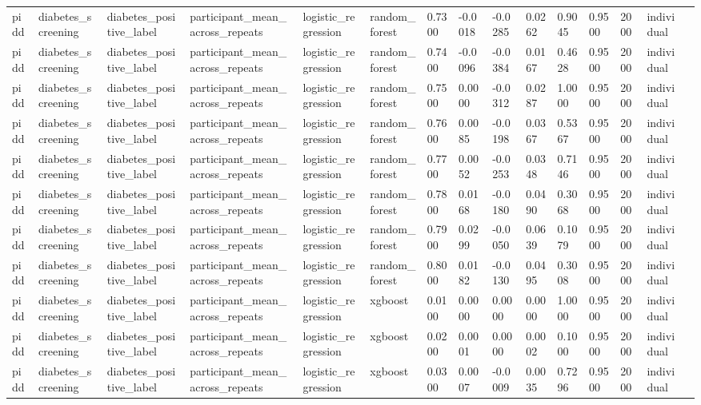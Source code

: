 \begin{tabular}{lllllllllllllll}
pidd & diabetes\_screening & diabetes\_positive\_label & participant\_mean\_across\_repeats & logistic\_regression & random\_forest & 0.7300 & -0.0018 & -0.0285 & 0.0262 & 0.9045 & 0.9500 & 2000 & individual &  \\
pidd & diabetes\_screening & diabetes\_positive\_label & participant\_mean\_across\_repeats & logistic\_regression & random\_forest & 0.7400 & -0.0096 & -0.0384 & 0.0167 & 0.4628 & 0.9500 & 2000 & individual &  \\
pidd & diabetes\_screening & diabetes\_positive\_label & participant\_mean\_across\_repeats & logistic\_regression & random\_forest & 0.7500 & 0.0000 & -0.0312 & 0.0287 & 1.0000 & 0.9500 & 2000 & individual &  \\
pidd & diabetes\_screening & diabetes\_positive\_label & participant\_mean\_across\_repeats & logistic\_regression & random\_forest & 0.7600 & 0.0085 & -0.0198 & 0.0367 & 0.5367 & 0.9500 & 2000 & individual &  \\
pidd & diabetes\_screening & diabetes\_positive\_label & participant\_mean\_across\_repeats & logistic\_regression & random\_forest & 0.7700 & 0.0052 & -0.0253 & 0.0348 & 0.7146 & 0.9500 & 2000 & individual &  \\
pidd & diabetes\_screening & diabetes\_positive\_label & participant\_mean\_across\_repeats & logistic\_regression & random\_forest & 0.7800 & 0.0168 & -0.0180 & 0.0490 & 0.3068 & 0.9500 & 2000 & individual &  \\
pidd & diabetes\_screening & diabetes\_positive\_label & participant\_mean\_across\_repeats & logistic\_regression & random\_forest & 0.7900 & 0.0299 & -0.0050 & 0.0639 & 0.1079 & 0.9500 & 2000 & individual &  \\
pidd & diabetes\_screening & diabetes\_positive\_label & participant\_mean\_across\_repeats & logistic\_regression & random\_forest & 0.8000 & 0.0182 & -0.0130 & 0.0495 & 0.3008 & 0.9500 & 2000 & individual &  \\
pidd & diabetes\_screening & diabetes\_positive\_label & participant\_mean\_across\_repeats & logistic\_regression & xgboost & 0.0100 & 0.0000 & 0.0000 & 0.0000 & 1.0000 & 0.9500 & 2000 & individual &  \\
pidd & diabetes\_screening & diabetes\_positive\_label & participant\_mean\_across\_repeats & logistic\_regression & xgboost & 0.0200 & 0.0001 & 0.0000 & 0.0002 & 0.1000 & 0.9500 & 2000 & individual &  \\
pidd & diabetes\_screening & diabetes\_positive\_label & participant\_mean\_across\_repeats & logistic\_regression & xgboost & 0.0300 & 0.0007 & -0.0009 & 0.0035 & 0.7296 & 0.9500 & 2000 & individual &  \\

\end{tabular}
